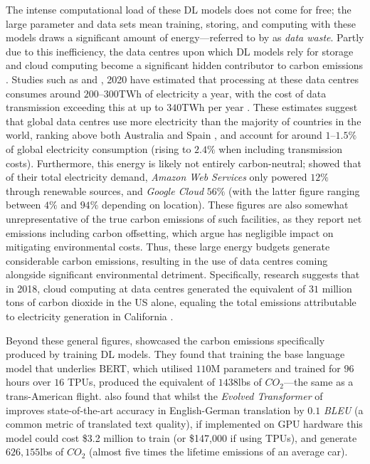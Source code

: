 \documentclass[a4paper, 11pt]{report}
\begin{document}
    The intense computational load of these DL models does not come for free; the large parameter and data sets mean training, storing, and computing with these models draws a significant amount of energy---referred to by \citet{bietti-2019} as \emph{data waste}. Partly due to this inefficiency, the data centres upon which DL models rely for storage and cloud computing become a significant hidden contributor to carbon emissions \citep{aljarrah-2015}. Studies such as \citet{masanet-2020} and \citet{malmodin-2018}, 2020 have estimated that processing at these data centres consumes around $200\text{--}300$TWh of electricity a year, with the cost of data transmission exceeding this at up to $340$TWh per year \citep{iea-2022}. These estimates suggest that global data centres use more electricity than the majority of countries in the world, ranking above both Australia and Spain \citep{eia-2019}, and account for around $1\text{--}1.5\%$ of global electricity consumption (rising to $2.4\%$ when including transmission costs). Furthermore, this energy is likely not entirely carbon-neutral; \citet{cook-2017} showed that of their total electricity demand, \emph{Amazon Web Services} only powered $12\%$ through renewable sources, and \emph{Google Cloud} $56\%$ (with the latter figure ranging between $4\%$ and $94\%$ depending on location). These figures are also somewhat unrepresentative of the true carbon emissions of such facilities, as they report net emissions including carbon offsetting, which \citet{schwartz-2019} argue has negligible impact on mitigating environmental costs. Thus, these large energy budgets generate considerable carbon emissions, resulting in the use of data centres coming alongside significant environmental detriment. Specifically, research suggests that in 2018, cloud computing at data centres generated the equivalent of $31$ million tons of carbon dioxide \citep{hockstad-2018} in the US alone, equaling the total emissions  attributable to electricity generation in California \citep{iea-2022}.
    
    Beyond these general figures, \citet{strubell-2019} showcased the carbon emissions specifically produced by training DL models. They found that training the base language model that underlies BERT, which utilised $110$M parameters and trained for $96$ hours over $16$ TPUs, produced the equivalent of $1438$lbs of $CO_2$---the same as a trans-American flight. \citeauthor{strubell-2019} also found that whilst the \emph{Evolved Transformer} of \citet{so-2019} improves state-of-the-art accuracy in English-German translation by $0.1$ \emph{BLEU} (a common metric of translated text quality), if implemented on GPU hardware this model could cost \$3.2 million to train (or \$147,000 if using TPUs), and generate $626,155$lbs of $CO_2$ (almost five times the lifetime emissions of an average car).
\end{document}
